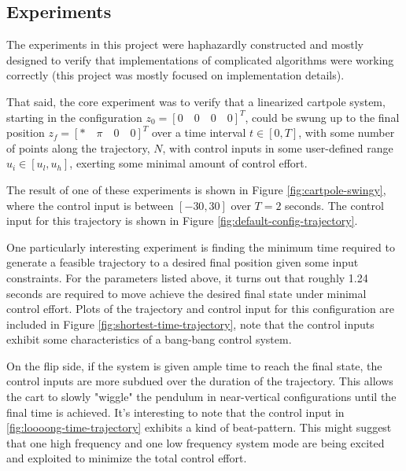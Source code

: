\documentclass{exam}
\begin{document}
\begin{multicols}{2}
\section{Experiments}

The experiments in this project were haphazardly constructed and mostly designed to verify that implementations of complicated algorithms were working correctly (this project was mostly focused on implementation details).

That said, the core experiment was to verify that a linearized cartpole system, starting in the configuration $z_0 = [0 \quad 0 \quad 0 \quad 0]^T$, could be swung up to the final position $z_f = [* \quad \pi \quad 0 \quad 0]^T$ over a time interval $t \in [0, T]$, with some number of points along the trajectory, $N$, with control inputs in some user-defined range $u_i \in [u_l, u_h]$, exerting some minimal amount of control effort.

The result of one of these experiments is shown in Figure \ref{fig:cartpole-swingy}, where the control input is between $[-30, 30]$ over $T = 2$ seconds. The control input for this trajectory is shown in Figure \ref{fig:default-config-trajectory}.

One particularly interesting experiment is finding the minimum time required to generate a feasible trajectory to a desired final position given some input constraints. For the parameters listed above, it turns out that roughly 1.24 seconds are required to move achieve the desired final state under minimal control effort. Plots of the trajectory and control input for this configuration are included in Figure \ref{fig:shortest-time-trajectory}, note that the control inputs exhibit some characteristics of a bang-bang control system.

On the flip side, if the system is given ample time to reach the final state, the control inputs are more subdued over the duration of the trajectory. This allows the cart to slowly "wiggle" the pendulum in near-vertical configurations until the final time is achieved. It's interesting to note that the control input in \ref{fig:loooong-time-trajectory} exhibits a kind of beat-pattern. This might suggest that one high frequency and one low frequency system mode are being excited and exploited to minimize the total control effort.


\end{multicols}
\end{document}
